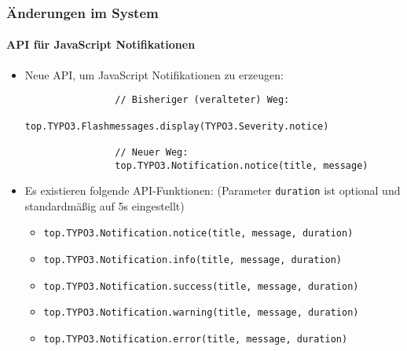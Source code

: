 \begin{frame}[fragile]
	\frametitle{Änderungen im System}
	\framesubtitle{API für JavaScript Notifikationen}


	\begin{itemize}

		\item Neue API, um JavaScript Notifikationen zu erzeugen:
			\begin{lstlisting}
				// Bisheriger (veralteter) Weg:
				top.TYPO3.Flashmessages.display(TYPO3.Severity.notice)

				// Neuer Weg:
				top.TYPO3.Notification.notice(title, message)
    		\end{lstlisting}

		\item Es existieren folgende API-Funktionen:\newline
			\small(Parameter \texttt{duration} ist optional und standardmäßig auf 5s eingestellt)\normalsize
			\begin{itemize}
				\item \normalsize\smaller\texttt{top.TYPO3.Notification.notice(title, message, duration)}\normalsize
				\item \smaller\texttt{top.TYPO3.Notification.info(title, message, duration)}\normalsize
				\item \smaller\texttt{top.TYPO3.Notification.success(title, message, duration)}\normalsize
				\item \smaller\texttt{top.TYPO3.Notification.warning(title, message, duration)}\normalsize
				\item \smaller\texttt{top.TYPO3.Notification.error(title, message, duration)}\normalsize
			\end{itemize}

	\end{itemize}

\end{frame}

